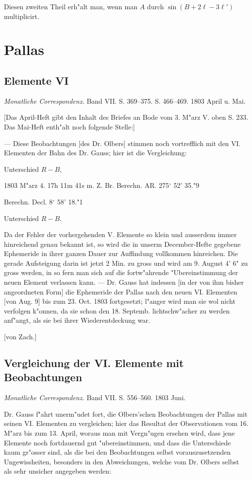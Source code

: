 \documentclass[12pt,a4paper]{article}
\begin{document}
Diesen zweiten Theil erh"alt man, wenn man $A$ durch $\sin(B + 2\ell - 3\ell')$ multiplicirt.

\section{Pallas}

\subsection{Elemente VI}

\textit{Monatliche Correspondenz.} Band VII. S. 369--375. S. 466--469. 1803 April u. Mai.

[Das April-Heft gibt den Inhalt des Briefes an Bode vom 3. M"arz V. oben S. 233. Das Mai-Heft enth"alt noch folgende Stelle:]

--- Diese Beobachtungen [des Dr. Olbers] stimmen noch vortrefflich mit den VI. Elementen der Bahn des Dr. Gauss; hier ist die Vergleichung:

Unterschied $R - B$,

1803 M"arz 4. 17h 11m 41s m. Z. Br. Berechn. AR. 275$^\circ$ 52' 35."9

Berechn. Decl. 8$^\circ$ 58' 18."1

Unterschied $R - B$.

Da der Fehler der vorhergehenden V. Elemente so klein und ausserdem immer hinreichend genau bekannt ist, so wird die in unserm December-Hefte gegebene Ephemeride in ihrer ganzen Dauer zur Auffindung vollkommen hinreichen. Die gerade Aufsteigung darin ist jetzt 2 Min. zu gross und wird am 9. August 4' 6" zu gross werden, in so fern man sich auf die fortw"ahrende "Ubereinstimmung der neuen Element verlassen kann. --- Dr. Gauss hat indessen [in der von ihm bisher angeordneten Form] die Ephemeride der Pallas nach den neuen VI. Elementen [von Aug. 9] bis zum 23. Oct. 1803 fortgesetzt; l"anger wird man sie wol nicht verfolgen k"onnen, da sie schon den 18. Septemb. lichtschw"acher zu werden anf"angt, als sie bei ihrer Wiederentdeckung war.

[von Zach.]

\subsection{Vergleichung der VI. Elemente mit Beobachtungen}

\textit{Monatliche Correspondenz.} Band VII. S. 556--560. 1803 Juni.

Dr. Gauss f"ahrt unerm"udet fort, die Olbers'schen Beobachtungen der Pallas mit seinen VI. Elementen zu vergleichen; hier das Resultat der Observationen vom 16. M"arz bis zum 13. April, woraus man mit Vergn"ugen ersehen wird, dass jene Elemente noch fortdauernd gut "ubereinstimmen, und dass die Unterschiede kaum gr"osser sind, als die bei den Beobachtungen selbst vorauszusetzenden Ungewissheiten, besonders in den Abweichungen, welche vom Dr. Olbers selbst als sehr unsicher angegeben werden:
\end{document}
